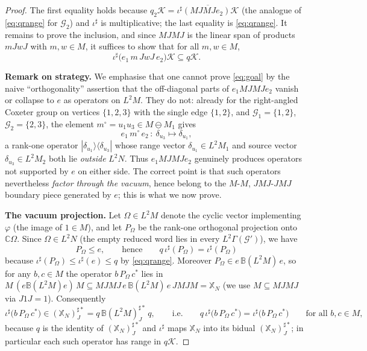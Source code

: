\documentclass[a4paper, 11pt, reqno]{amsart}
\numberwithin{equation}{section}
\theoremstyle{plain}
\theoremstyle{remark}
\theoremstyle{definition}
\newcommand{\C}{\mathbb{C}}
\newcommand{\B}{\mathbb{B}}
\newcommand{\KK}{{\mathcal K}}
\newcommand{\XX}{{\mathbb{X}}}
\newcommand{\GG}{{\mathcal G}}
\begin{document}
\begin{proof}
The first equality holds because $q_2\KK=\overline{\iota^\sharp(MJMJe_2)\KK}$ (the analogue of \eqref{eq:qrange} for $\GG_2$) and $\iota^\sharp$ is multiplicative; the last equality is \eqref{eq:qrange}. It remains to prove the inclusion, and since $MJMJ$ is the linear span of products $mJwJ$ with $m,w\in M$, it suffices to show that for all $m,w\in M$,
\begin{equation}\label{eq:goal}
\iota^\sharp\big(e_1\,m\,JwJ\,e_2\big)\KK\subseteq q\KK .
\end{equation}

\medskip\noindent\textbf{Remark on strategy.}
We emphasise that one cannot prove \eqref{eq:goal} by the naive ``orthogonality'' assertion that the off-diagonal parts of $e_1MJMJe_2$ vanish or collapse to $e$ as operators on $L^2M$. They do not: already for the right-angled Coxeter group on vertices $\{1,2,3\}$ with the single edge $\{1,2\}$, and $\GG_1=\{1,2\}$, $\GG_2=\{2,3\}$, the element $m^\circ=u_1u_3\in M\ominus M_1$ gives
\[
e_1\,m^\circ\,e_2\,\colon\ \delta_{u_3}\longmapsto\delta_{u_1},
\]
a rank-one operator $|\delta_{u_1}\rangle\langle\delta_{u_3}|$ whose range vector $\delta_{u_1}\in L^2M_1$ and source vector $\delta_{u_3}\in L^2M_2$ both lie \emph{outside} $L^2N$. Thus $e_1MJMJe_2$ genuinely produces operators not supported by $e$ on either side. The correct point is that such operators nevertheless \emph{factor through the vacuum}, hence belong to the $M$-$M$, $JMJ$-$JMJ$ boundary piece generated by $e$; this is what we now prove.

\medskip\noindent\textbf{The vacuum projection.}
Let $\Omega\in L^2M$ denote the cyclic vector implementing $\varphi$ (the image of $1\in M$), and let $P_\Omega$ be the rank-one orthogonal projection onto $\C\Omega$. Since $\Omega\in L^2N$ (the empty reduced word lies in every $L^2\Gamma(\GG')$), we have
\begin{equation}\label{eq:Pomega}
P_\Omega\le e,\qquad\text{hence}\qquad q\,\iota^\sharp(P_\Omega)=\iota^\sharp(P_\Omega)
\end{equation}
because $\iota^\sharp(P_\Omega)\le\iota^\sharp(e)\le q$ by \eqref{eq:qrange}. Moreover $P_\Omega\in e\,\B(L^2M)\,e$, so for any $b,c\in M$ the operator $b\,P_\Omega\,c^*$ lies in $M\,(e\B(L^2M)e)\,M\subseteq MJMJ\,e\,\B(L^2M)\,e\,JMJM=\XX_N$ (we use $M\subseteq MJMJ$ via $J1J=1$). Consequently
\begin{equation}\label{eq:rank-one-inX}
\iota^\sharp\big(b\,P_\Omega\,c^*\big)\in(\XX_N)^{\sharp*}_J=q\,\B(L^2M)^{\sharp*}_J\,q,\qquad\text{i.e.}\qquad q\,\iota^\sharp\big(b\,P_\Omega\,c^*\big)=\iota^\sharp\big(b\,P_\Omega\,c^*\big)\qquad\text{for all }b,c\in M,
\end{equation}
because $q$ is the identity of $(\XX_N)^{\sharp*}_J$ and $\iota^\sharp$ maps $\XX_N$ into its bidual $(\XX_N)^{\sharp*}_J$; in particular each such operator has range in $q\KK$.


\end{proof}
\end{document}
